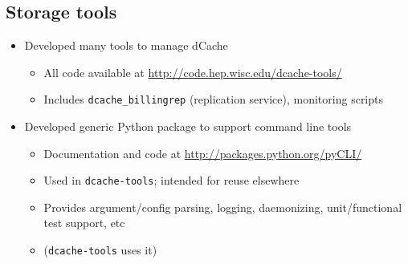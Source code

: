 \documentclass{beamer}
\begin{document}
\subsection{Storage tools}
\begin{frame}
\begin{itemize}
	\item Developed many tools to manage dCache
	\begin{itemize}
		\item All code available at \url{http://code.hep.wisc.edu/dcache-tools/}
		\item Includes {\tt dcache\_billingrep} (replication service), monitoring scripts
	\end{itemize}
	\item Developed generic Python package to support command line tools
	\begin{itemize}
		\item Documentation and code at \url{http://packages.python.org/pyCLI/}
		\item Used in {\tt dcache-tools}; intended for reuse elsewhere
		\item Provides argument/config parsing, logging, daemonizing, unit/functional test support, etc
		\item ({\tt dcache-tools} uses it)
	\end{itemize}
\end{itemize}
\end{frame}
\end{document}
